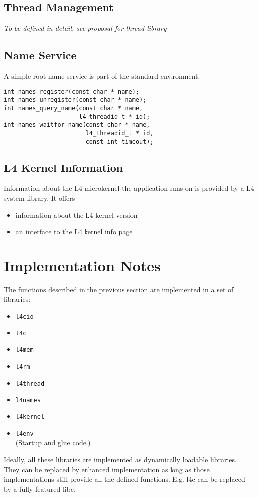 \documentclass[twocolumn,10pt]{article}
\begin{document}
\subsection{Thread Management}

\emph{To be defined in detail, see proposal for thread library}

\subsection{Name Service}
 
A simple root name service is part of the standard environment.

\begin{Verbatim}[fontsize=\small]
int names_register(const char * name);
int names_unregister(const char * name);
int names_query_name(const char * name, 
                     l4_threadid_t * id);
int names_waitfor_name(const char * name, 
                       l4_threadid_t * id, 
                       const int timeout);
\end{Verbatim}

\subsection{L4 Kernel Information}

Information about the L4 microkernel the application runs on is
provided by a L4 system library.  It offers
\begin{itemize}
\item information about the L4 kernel version 
\item an interface to the L4 kernel info page
\end{itemize}

\section{Implementation Notes}

The functions described in the previous section are implemented in a
set of libraries: 
\begin{itemize}
\item {\tt l4cio}
\item {\tt l4c}
\item {\tt l4mem}
\item {\tt l4rm}
\item {\tt l4thread}
\item {\tt l4names}
\item {\tt l4kernel}
\item {\tt l4env}\\
(Startup and glue code.)
\end{itemize}
Ideally, all these libraries are implemented as dynamically loadable
libraries. They can be replaced by enhanced implementation as long as
those implementations still provide all the defined
functions. E.g. l4c can be replaced by a fully featured libc.
 
\end{document}
